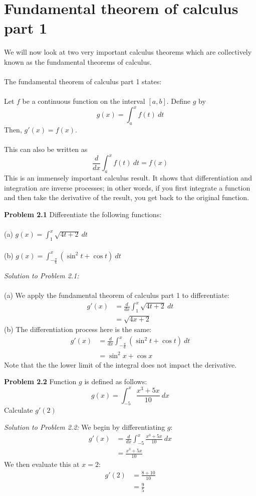\documentclass[11pt]{scrartcl}
\begin{document}
\section{Fundamental theorem of calculus part 1}
\noindent 
We will now look at two very important calculus theorems which are collectively known as the fundamental theorems of calculus. \\
\\
\noindent 
The fundamental theorem of calculus part 1 states: \\
\\
\noindent 
Let $f$ be a continuous function on the interval $[a,b]$. Define $g$ by 
$$g(x)=\int_a^x f(t) \ dt$$
\noindent 
Then, $g'(x)=f(x)$. \\
\\
\noindent 
This can also be written as 
$$\frac{d}{dx}\int_a^x f(t) \ dt=f(x)$$
\noindent 
This is an immensely important calculus result. It shows that differentiation and integration are inverse processes; in other words, if you first integrate a function and then take the derivative of the result, you get back to the original function. 
\begin{tcolorbox}[colback=purple!5!white,colframe=purple!75!black]
\textbf{Problem 2.1} Differentiate the following functions: \\
\\
\noindent 
(a) $g(x)=\int_1^x \sqrt{4t+2} \ dt$  \\
\\
\noindent 
(b) $g(x)=\int_{-\frac{\pi}{6}}^x (\sin^2 t+\cos t) \ dt$
\end{tcolorbox}
\noindent 
\textit{Solution to Problem 2.1:} \\
\\
\noindent
(a) We apply the fundamental theorem of calculus part 1 to differentiate: 
\begin{align*}
g'(x) &=\frac{d}{dx}\int_1^x \sqrt{4t+2} \ dt \\
      &=\sqrt{4x+2} 
\end{align*} 
\noindent 
(b) The differentiation process here is the same: 
\begin{align*}
g'(x) &=\frac{d}{dx}\int_{-\frac{\pi}{6}}^{x}(\sin ^2 t + \cos t) \ dt \\
      &=\sin^2 x+\cos x
\end{align*}
\noindent 
Note that the the lower limit of the integral does not impact the derivative.
\begin{tcolorbox}[colback=purple!5!white,colframe=purple!75!black]
\textbf{Problem 2.2} Function $g$ is defined as follows: 
$$g(x)=\int_{-5}^x \frac{x^3+5x}{10} \ dx$$
\noindent 
Calculate $g'(2)$
\end{tcolorbox}
\noindent 
\textit{Solution to Problem 2.2:} We begin by differentiating $g$: 
\begin{align*}
g'(x) &=\frac{d}{dx} \int_{-5}^x \frac{x^3+5x}{10} \ dx \\
      &=\frac{x^3+5x}{10}
\end{align*}
\noindent 
We then evaluate this at $x=2$: 
\begin{align*}
    g'(2) &=\frac{8+10}{10} \\
          &=\frac{9}{5}
\end{align*}
\noindent 
\end{document}
